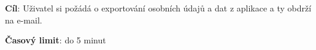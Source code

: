 








\vspace{1em}

\textbf{Cíl}: Uživatel si požádá o exportování osobních údajů a dat z aplikace a ty obdrží na e-mail.

\textbf{Časový limit}: do 5 minut

